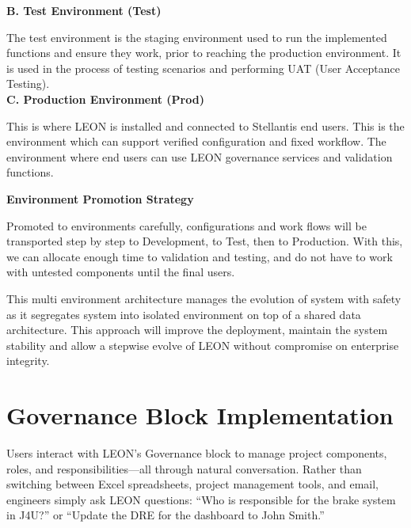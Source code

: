 \vspace{0.2cm}
\noindent\textcolor[HTML]{0066CC}{\textbf{B. Test Environment (Test)}}

The test environment is the staging environment used to run the implemented functions and ensure they work, prior to reaching the production environment. It is used in the process of testing scenarios and performing UAT (User Acceptance Testing).\\

\vspace{0.2cm}
\noindent\textcolor[HTML]{0066CC}{\textbf{C. Production Environment (Prod)}}

This is where LEON is installed and connected to Stellantis end users. This is the environment which can support verified configuration and fixed workflow. The environment where end users can use LEON governance services and validation functions.

\vspace{0.3cm}
\noindent\textcolor[HTML]{003D99}{\textbf{Environment Promotion Strategy}}

Promoted to environments carefully, configurations and work flows will be transported step by step to Development, to Test, then to Production. With this, we can allocate enough time to validation and testing, and do not have to work with untested components until the final users.

\vspace{0.3cm}

This multi environment architecture manages the evolution of system with safety as it segregates system into isolated environment on top of a shared data architecture. This approach will improve the deployment, maintain the system stability and allow a stepwise evolve of LEON without compromise on enterprise integrity.

\section{\textcolor[HTML]{0066CC}{Governance Block Implementation}}
\label{sec:impl-governance}

Users interact with LEON's Governance block to manage project components, roles, and responsibilities—all through natural conversation. Rather than switching between Excel spreadsheets, project management tools, and email, engineers simply ask LEON questions: ``Who is responsible for the brake system in J4U?'' or ``Update the DRE for the dashboard to John Smith.''

